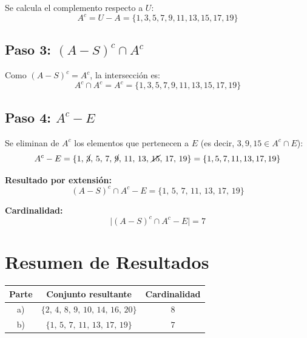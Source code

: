 \documentclass[12pt]{article}
\begin{document}
	Se calcula el complemento respecto a $U$:
	\[
	A^c = U - A = \{1, 3, 5, 7, 9, 11, 13, 15, 17, 19\}
	\]
	
	\subsection*{Paso 3: $(A-S)^c \cap A^c$}
	
	Como $(A-S)^c = A^c$, la intersección es:
	\[
	A^c \cap A^c = A^c = \{1, 3, 5, 7, 9, 11, 13, 15, 17, 19\}
	\]
	
	\subsection*{Paso 4: $A^c - E$}
	
	Se eliminan de $A^c$ los elementos que pertenecen a $E$
	(es decir, $3, 9, 15 \in A^c \cap E$):
	\[
	A^c - E
	= \{1,\, \cancel{3},\, 5,\, 7,\, \cancel{9},\, 11,\, 13,\, \cancel{15},\, 17,\, 19\}
	= \{1, 5, 7, 11, 13, 17, 19\}
	\]
	
	\medskip
	\noindent\textbf{Resultado por extensión:}
	\[
	(A-S)^c \cap A^c - E = \{1,\, 5,\, 7,\, 11,\, 13,\, 17,\, 19\}
	\]
	
	\noindent\textbf{Cardinalidad:}
	\[
	\bigl|(A-S)^c \cap A^c - E\bigr| = 7
	\]
	
	\bigskip
	
	\section*{Resumen de Resultados}
	
	\begin{center}
		\renewcommand{\arraystretch}{1.6}
		\begin{tabular}{ccc}
			\toprule
			\textbf{Parte} & \textbf{Conjunto resultante} & \textbf{Cardinalidad} \\
			\midrule
			a) & $\{2,\, 4,\, 8,\, 9,\, 10,\, 14,\, 16,\, 20\}$ & $8$ \\
			b) & $\{1,\, 5,\, 7,\, 11,\, 13,\, 17,\, 19\}$       & $7$ \\
			\bottomrule
		\end{tabular}
	\end{center}
	
\end{document}
